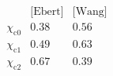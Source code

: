 $$
\begin{array}{c|cc}
 \text{} & \text{[Ebert]} & \text{[Wang]} \\
\hline
 \chi_{\text{c0}} & 0.38 & 0.56 \\
 \chi_{\text{c1}} & 0.49 & 0.63 \\
 \chi_{\text{c2}} & 0.67 & 0.39 \\
\end{array}$$
